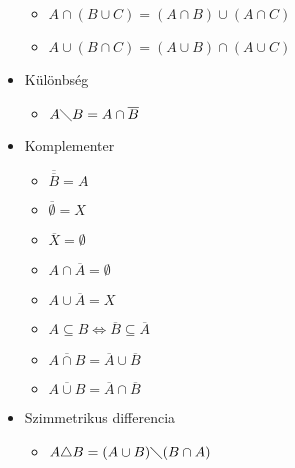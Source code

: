 \documentclass[margin=0px]{article}
\begin{document}
\begin{description}
\begin{itemize}
\begin{itemize}
                      \item $A \cap ( B \cup C ) = (A \cap B) \cup (A \cap C)$
                      \item $A \cup ( B \cap C ) = (A \cup B) \cap (A \cup C)$
                  \end{itemize}
            \item Különbség
                  \begin{itemize}
                      \item $A \diagdown B = A \cap \overline{B}$
                  \end{itemize}
            \item Komplementer
                  \begin{itemize}
                      \item $\overline{\overline{B}} = A$
                      \item $\overline{\emptyset} = X$
                      \item $\overline{X} = \emptyset$
                      \item $A \cap \overline{A} = \emptyset$
                      \item $A \cup \overline{A} = X$
                      \item $A \subseteq B \Longleftrightarrow \overline{B} \subseteq \overline{A}$
                      \item $\overline{A \cap B} = \overline{A} \cup \overline{B}$
                      \item $\overline{A \cup B} = \overline{A} \cap \overline{B}$
                  \end{itemize}
            \item Szimmetrikus differencia
                  \begin{itemize}
                      \item $A \triangle B = (A \cup B) \diagdown (B \cap A)$
                  \end{itemize}
        \end{itemize}
\end{description}
\end{document}
